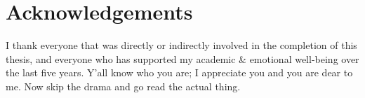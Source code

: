 \chapter*{Acknowledgements}
I thank everyone that was directly or indirectly involved in the completion of this thesis, and everyone who has supported my academic \& emotional well-being over the last five years. Y'all know who you are; I appreciate you and you are dear to me. Now skip the drama and go read the actual thing.